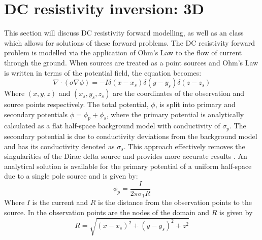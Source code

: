 %
%
%

\section{DC resistivity inversion: 3D}\label{sec:forward DCRES}
This section will discuss DC resistivity forward modelling, as well as an \escript
class which allows for solutions of these forward problems. The DC resistivity 
forward problem is modelled via the application of Ohm's Law to the flow of current
through the ground. When sources are treated as a point sources and Ohm's Law 
is written in terms of the potential field, the equation becomes:
\begin{equation} \label{ref:dcres:eq1}
\nabla \cdot (\sigma \nabla \phi) = -I \delta(x-x_s) \delta(y-y_s) \delta(z-z_s)
\end{equation}
Where $(x,y,z)$ and $(x_s, y_s, z_s)$ are the coordinates of the observation and source
points respectively. The total potential, $\phi$, is split into primary and secondary 
potentials $\phi = \phi_p + \phi_s$, where the primary potential is analytically calculated 
as a flat half-space background model with conductivity of $\sigma_p$. 
The secondary potential is due to conductivity deviations 
from the background model and has its conductivity denoted as $\sigma_s$. 
This approach effectively removes the singularities of the Dirac delta 
source and provides more accurate results \cite{rucker2006three}.
An analytical solution is available for the primary potential of a uniform half-space due to a single pole source and is given by:
\begin{equation} \label{ref:dcres:eq2}
\phi_p = \frac{I}{2 \pi \sigma_1 R}
\end{equation}
Where $I$ is the current and $R$ is the distance from the observation points to the source.
In \escript the observation points are the nodes of the domain and $R$ is given by
\begin{equation} \label{ref:dcres:eq3}
R = \sqrt{(x-x_s)^2+(y-y_s)^2 + z^2}
\end{equation}
